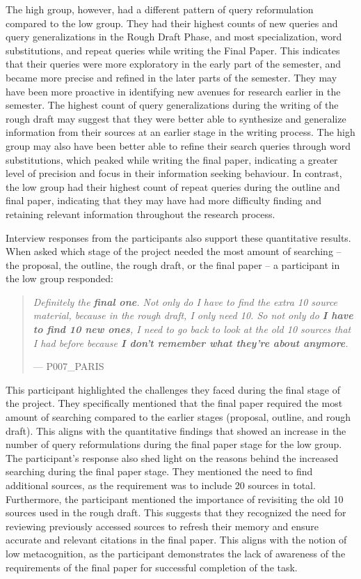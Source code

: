 \documentclass[letterpaper, nobind]{templates/ociamthesis}
\begin{document}
The high group, however, had a different pattern of query reformulation compared to the low group.
They had their highest counts of new queries and query generalizations in the Rough Draft Phase, and most specialization, word substitutions, and repeat queries while writing the Final Paper.
This indicates that their queries were more exploratory in the early part of the semester, and became more precise and refined in the later parts of the semester.
They may have been more proactive in identifying new avenues for research earlier in the semester.
The highest count of query generalizations during the writing of the rough draft may suggest that they were better able to synthesize and generalize information from their sources at an earlier stage in the writing process.
The high group may also have been better able to refine their search queries through word substitutions, which peaked while writing the final paper, indicating a greater level of precision and focus in their information seeking behaviour.
In contrast, the low group had their highest count of repeat queries during the outline and final paper, indicating that they may have had more difficulty finding and retaining relevant information throughout the research process.

Interview responses from the participants also support these quantitative results.
When asked which stage of the project needed the most amount of searching -- the proposal, the outline, the rough draft, or the final paper -- a participant in the low group responded:

\begin{quote}
\emph{Definitely the \textbf{final one}. Not only do I have to find the extra 10 source material, because in the rough draft, I only need 10. So not only do \textbf{I have to find 10 new ones}, I need to go back to look at the old 10 sources that I had before because \textbf{I don't remember what they're about anymore}.}

\hfill --- P007\_PARIS
\end{quote}

This participant highlighted the challenges they faced during the final stage of the project. They specifically mentioned that the final paper required the most amount of searching compared to the earlier stages (proposal, outline, and rough draft). This aligns with the quantitative findings that showed an increase in the number of query reformulations during the final paper stage for the low group. The participant's response also shed light on the reasons behind the increased searching during the final paper stage. They mentioned the need to find additional sources, as the requirement was to include 20 sources in total.
Furthermore, the participant mentioned the importance of revisiting the old 10 sources used in the rough draft. This suggests that they recognized the need for reviewing previously accessed sources to refresh their memory and ensure accurate and relevant citations in the final paper.
This aligns with the notion of low metacognition, as the participant demonstrates the lack of awareness of the requirements of the final paper for successful completion of the task.
\end{document}
